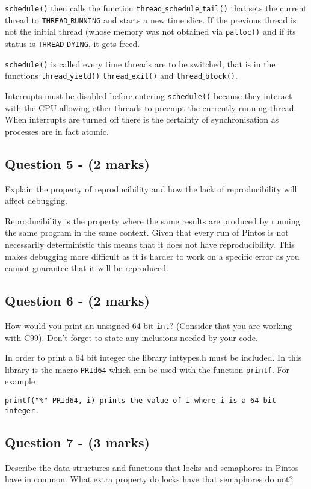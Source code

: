 \documentclass[a4paper,12pt]{article}
\begin{document}
\texttt{schedule()} then calls the function \texttt{thread$\_$schedule$\_$tail()} that sets the current thread to \texttt{THREAD$\_$RUNNING} and starts a new time slice. If the previous thread is not the initial thread (whose memory was not obtained via \texttt{palloc()} and if its status is \texttt{THREAD$\_$DYING}, it gets freed.

\texttt{schedule()} is called every time threads are to be switched, that is in the functions \texttt{thread$\_$yield()} \texttt{thread$\_$exit()} and \texttt{thread$\_$block()}.

Interrupts must be disabled before entering \texttt{schedule()} because they interact with the CPU allowing other threads to preempt the currently running thread. When interrupts are turned off there is the certainty of synchronisation as processes are in fact atomic.\\

\subsection*{Question 5 - (2 marks)}
Explain the property of reproducibility and how the lack of reproducibility will affect debugging.

Reproducibility is the property where the same results are produced by running the same program in the same context. Given that every run of Pintos is not necessarily deterministic this means that it does not have reproducibility. This makes debugging more difficult as it is harder to work on a specific error as you cannot guarantee that it will be reproduced.\\

\subsection*{Question 6 - (2 marks)}
How would you print an unsigned 64 bit \texttt{int}?
(Consider that you are working with C99).
Don't forget to state any inclusions needed by your code.

In order to print a 64 bit integer the library inttypes.h must be included. In this library is the macro \texttt{PRId64} which can be used with the function \texttt{printf}. For example

\begin{verbatim}
printf("%" PRId64, i) prints the value of i where i is a 64 bit integer.
\end{verbatim}

\subsection*{Question 7 - (3 marks)}
Describe the data structures and functions that locks and semaphores in Pintos have in common.
What extra property do locks have that semaphores do not?
\end{document}
